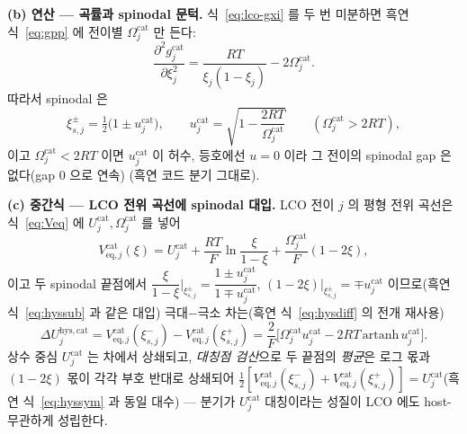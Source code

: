 \documentclass[11pt,a4paper]{article}
\newcommand{\eq}{\mathrm{eq}}
\newcommand{\hys}{\mathrm{hys}}
\begin{document}
\textbf{(b) 연산 — 곡률과 spinodal 문턱.}
식~\eqref{eq:lco-gxi} 를 두 번 미분하면 흑연 식~\eqref{eq:gpp} 에 전이별 $\Omega_j^\mathrm{cat}$ 만 든다:
\begin{equation}
\frac{\partial^2 g_j^\mathrm{cat}}{\partial\xi_j^2}=\frac{RT}{\xi_j(1-\xi_j)}-2\Omega_j^\mathrm{cat}.
\label{eq:lco-gpp}
\end{equation}
따라서 spinodal 은
\begin{equation}
\xi_{s,j}^{\pm}=\tfrac12\big(1\pm u_j^\mathrm{cat}\big),\qquad
u_j^\mathrm{cat}=\sqrt{1-\frac{2RT}{\Omega_j^\mathrm{cat}}}\qquad(\Omega_j^\mathrm{cat}>2RT),
\label{eq:lco-spinodal}
\end{equation}
이고 $\Omega_j^\mathrm{cat}<2RT$ 이면 $u_j^\mathrm{cat}$ 이 허수, 등호에선 $u=0$ 이라 그 전이의 spinodal gap 은 없다(gap $0$ 으로 연속)
(흑연 코드 분기 그대로).

\textbf{(c) 중간식 — LCO 전위 곡선에 spinodal 대입.}
LCO 전이 $j$ 의 평형 전위 곡선은 식~\eqref{eq:Veq} 에 $U_j^\mathrm{cat},\Omega_j^\mathrm{cat}$ 를 넣어
\begin{equation}
V_{\eq,j}^\mathrm{cat}(\xi)=U_j^\mathrm{cat}
+\frac{RT}{F}\ln\frac{\xi}{1-\xi}+\frac{\Omega_j^\mathrm{cat}}{F}(1-2\xi),
\label{eq:lco-Veq}
\end{equation}
이고 두 spinodal 끝점에서 $\dfrac{\xi}{1-\xi}\Big|_{\xi_{s,j}^\pm}=\dfrac{1\pm u_j^\mathrm{cat}}{1\mp
u_j^\mathrm{cat}}$, $(1-2\xi)\big|_{\xi_{s,j}^\pm}=\mp u_j^\mathrm{cat}$ 이므로(흑연 식~\eqref{eq:hyssub}
과 같은 대입) 극대$-$극소 차는(흑연 식~\eqref{eq:hysdiff} 의 전개 재사용)
\[
\Delta U_{j}^{\hys,\mathrm{cat}}=V_{\eq,j}^\mathrm{cat}(\xi_{s,j}^-)-V_{\eq,j}^\mathrm{cat}(\xi_{s,j}^+)
=\frac{2}{F}\big[\Omega_j^\mathrm{cat}u_j^\mathrm{cat}-2RT\,\mathrm{artanh}\,u_j^\mathrm{cat}\big].
\]
상수 중심 $U_j^\mathrm{cat}$ 는 차에서 상쇄되고, \emph{대칭점 검산}으로 두 끝점의 \emph{평균}은 로그 몫과
$(1-2\xi)$ 몫이 각각 부호 반대로 상쇄되어 $\tfrac12[V_{\eq,j}^\mathrm{cat}(\xi_{s,j}^-)
+V_{\eq,j}^\mathrm{cat}(\xi_{s,j}^+)]=U_j^\mathrm{cat}$(흑연 식~\eqref{eq:hyssym} 과 동일 대수) —
분기가 $U_j^\mathrm{cat}$ 대칭이라는 성질이 LCO 에도 host-무관하게 성립한다.
\end{document}
